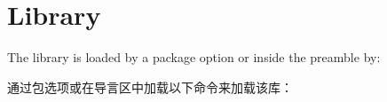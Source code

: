 \section{Library }\label{sec:fitting}%
%
The library is loaded by a package option or inside the preamble by:

通过包选项或在导言区中加载以下命令来加载该库：
\begin{dispListing}
\end{dispListing}